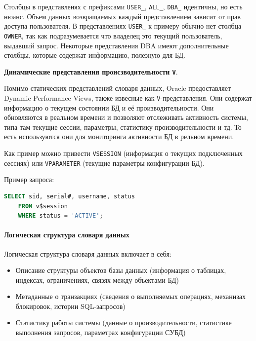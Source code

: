 \begin{enumerate}
\begin{enumerate}
    \end{enumerate}

    Столбцы в представленях с префиксами \texttt{USER\_}, \texttt{ALL\_}, \texttt{DBA\_} идентичны, но есть нюанс. Объем данных возвращаемых каждый представлением зависит от прав доступа пользователя. В представлениях \texttt{USER\_} к примеру обычно нет столбца \texttt{OWNER}, так как подразумевается что владелец это текущий пользователь, выдавший запрос. Некоторые представления DBA имеют дополнительные столбцы, которые содержат информацию, полезную для БД.

    \textbf{Динамические представления происзводительности \texttt{V\textdollar}}. \autocite{oracledbdoc2}

    Помимо статических представлений словаря данных, Oracle предоставляет Dynamic Performance Views, также извесные как \texttt{V\textdollar}-представления. Они содержат информацию о текущем состоянии БД и её производительности. Они обновляются в реальном времени и позволяют отслеживать активность системы, типа там текущие сессии, параметры, статистику производительности и тд. То есть используются они для мониторинга активности БД в рельном времени.

    Как пример можно привести \texttt{V\textdollar SESSION} (информация о текущих подключенных сессиях) или \texttt{V\textdollar PARAMETER} (текущие параметры конфигурации БД).

    Пример запроса:
    \begin{lstlisting}[language=SQL]
    SELECT sid, serial#, username, status 
    FROM v$session 
    WHERE status = 'ACTIVE';
    \end{lstlisting}
    
\end{enumerate}

\paragraph{Логическая структура словаря данных} \autocite{PostgreSQLdocc51,ElmasriNavathe,Silberschatz}

Логическая структура словаря данных включает в себя:

\begin{itemize}
    \item Описание структуры объектов базы данных (информация о таблицах, индексах, ограничениях, связях между объектами БД)
    \item Метаданные о транзакциях (сведения о выполняемых операциях, механизах блокировок, истории SQL-запросов)
    \item Статистику работы системы (данные о производительности, статистике выполнения запросов, параметрах конфигурации СУБД)
\end{itemize}

